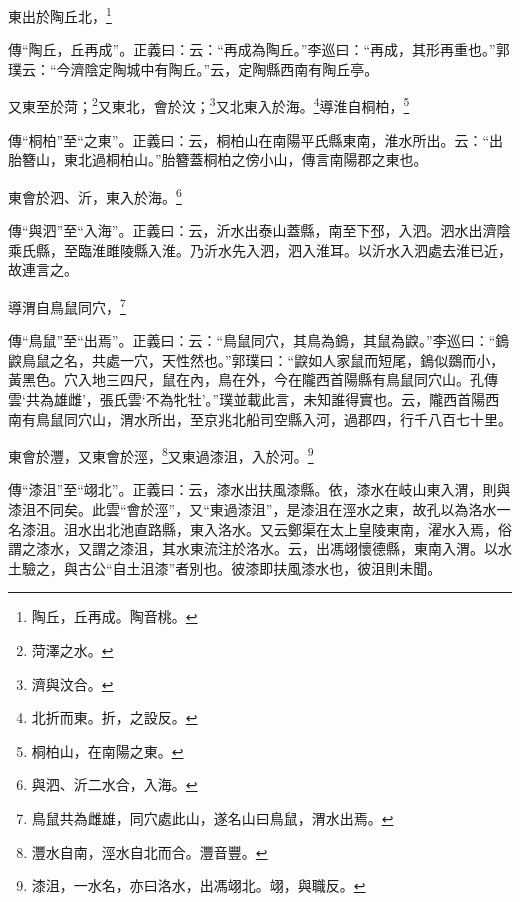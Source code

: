 東出於陶丘北，\footnote{陶丘，丘再成。陶音桃。}

{\noindent\zhuan{}\fzbyks 傳“陶丘，丘再成”。正義曰：云：“再成為陶丘。”李巡曰：“再成，其形再重也。”郭璞云：“今濟陰定陶城中有陶丘。”云，定陶縣西南有陶丘亭。 \par}

又東至於菏；\footnote{菏澤之水。}又東北，會於汶；\footnote{濟與汶合。}又北東入於海。\footnote{北折而東。折，之設反。}導淮自桐柏，\footnote{桐柏山，在南陽之東。}

{\noindent\zhuan{}\fzbyks 傳“桐柏”至“之東”。正義曰：云，桐柏山在南陽平氏縣東南，淮水所出。云：“出胎簪山，東北過桐柏山。”胎簪蓋桐柏之傍小山，傳言南陽郡之東也。 \par}

東會於泗、沂，東入於海。\footnote{與泗、沂二水合，入海。}

{\noindent\zhuan{}\fzbyks 傳“與泗”至“入海”。正義曰：云，沂水出泰山蓋縣，南至下邳，入泗。泗水出濟陰乘氏縣，至臨淮雎陵縣入淮。乃沂水先入泗，泗入淮耳。以沂水入泗處去淮已近，故連言之。 \par}

導渭自鳥鼠同穴，\footnote{鳥鼠共為雌雄，同穴處此山，遂名山曰鳥鼠，渭水出焉。}

{\noindent\zhuan{}\fzbyks 傳“鳥鼠”至“出焉”。正義曰：云：“鳥鼠同穴，其鳥為鵭，其鼠為鼵。”李巡曰：“鵭鼵鳥鼠之名，共處一穴，天性然也。”郭璞曰：“鼵如人家鼠而短尾，鵭似鵽而小，黃黑色。穴入地三四尺，鼠在內，鳥在外，今在隴西首陽縣有鳥鼠同穴山。孔傳雲‘共為雄雌’，張氏雲‘不為牝牡’。”璞並載此言，未知誰得實也。云，隴西首陽西南有鳥鼠同穴山，渭水所出，至京兆北船司空縣入河，過郡四，行千八百七十里。 \par}

東會於灃，又東會於涇，\footnote{灃水自南，涇水自北而合。灃音豐。}又東過漆沮，入於河。\footnote{漆沮，一水名，亦曰洛水，出馮翊北。翊，與職反。}

{\noindent\zhuan{}\fzbyks 傳“漆沮”至“翊北”。正義曰：云，漆水出扶風漆縣。依，漆水在岐山東入渭，則與漆沮不同矣。此雲“會於涇”，又“東過漆沮”，是漆沮在涇水之東，故孔以為洛水一名漆沮。沮水出北池直路縣，東入洛水。又云鄭渠在太上皇陵東南，濯水入焉，俗謂之漆水，又謂之漆沮，其水東流注於洛水。云，出馮翊懷德縣，東南入渭。以水土驗之，與古公“自土沮漆”者別也。彼漆即扶風漆水也，彼沮則未聞。 \par}

